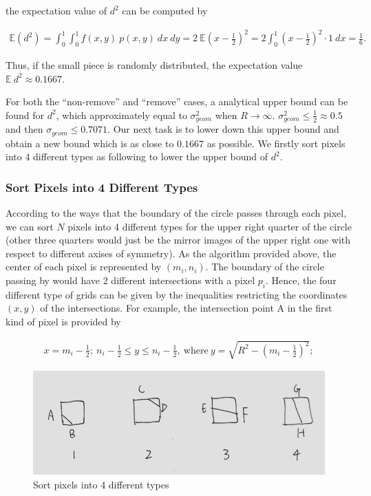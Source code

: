 \documentclass[letterpaper]{article}
\numberwithin{equation}{section} %
\numberwithin{figure}{section} %
\numberwithin{table}{section} %
\begin{document}
\noindent
the expectation value of $d^2$ can be computed by

\begin{align} 
\mathbb{E}(d^2) = \int_{0}^{1} \int_{0}^{1}f(x,y) \ p(x,y) \ dx \ dy = 2 \  \mathbb{E}(x-\frac{1}{2})^2 = 2 \int_{0}^{1}(x-\frac{1}{2})^2 \cdot 1 \ dx = \frac{1}{6}.
\end{align}

\noindent
Thus, if the small piece is randomly distributed, the expectation value $\mathbb{E}\ d^2 \approx 0.1667$. 

For both the \enquote{non-remove} and \enquote{remove} cases, a analytical upper bound can be found for $d^2$, which approximately equal to $\sigma_{geom}^2$ when $R \rightarrow \infty$. $\sigma_{geom}^2 \leq \frac{1}{2} \approx 0.5$ and then $\sigma_{geom} \leq 0.7071$. Our next task is to lower down this upper bound and obtain a new bound which is as close to $0.1667$ as possible. We firstly sort pixels into 4 different types as following to lower the upper bound of $d^2$.

\subsubsection{Sort Pixels into 4 Different Types}
According to the ways that the boundary of the circle passes through each pixel, we can sort $N$ pixels into 4 different types for the upper right quarter of the circle (other three quarters would just be the mirror images of the upper right one with respect to different axises of symmetry). As the algorithm provided above, the center of each pixel is represented by $(m_i, n_i)$. The boundary of the circle passing by would have 2 different intersections with a pixel $p_i$. Hence, the four different type of grids can be given by the inequalities restricting the coordinates $(x,y)$ of the intersections. For example, the intersection point A in the first kind of pixel is provided by  

\begin{align} 
x=m_i-\frac{1}{2}; \ n_i-\frac{1}{2}\leq y \leq n_i-\frac{1}{2}, \ \text{where} \ y=\sqrt{R^2-(m_i-\frac{1}{2})^2};
\end{align}

\begin{figure}[h]
	\centering
	\includegraphics[width=0.5\linewidth]{4ty}
	\caption{Sort pixels into 4 different types}
	\label{fig:4ty}
\end{figure}
\end{document}
